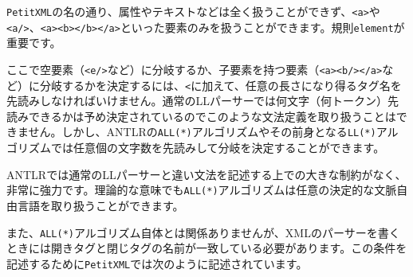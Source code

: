 \texttt{PetitXML}の名の通り、属性やテキストなどは全く扱うことができず、\texttt{\textless{}a\textgreater{}}や\texttt{\textless{}a/\textgreater{}}、\texttt{\textless{}a\textgreater{}\textless{}b\textgreater{}\textless{}/b\textgreater{}\textless{}/a\textgreater{}}といった要素のみを扱うことができます。規則\texttt{element}が重要です。

\begin{Shaded}
\begin{Highlighting}[]
\NormalTok{element returns [}\NormalTok{ e]}
\NormalTok{    : (}\CharTok{\textquotesingle{}\textless{}\textquotesingle{}}\CharTok{\textquotesingle{}\textgreater{}\textquotesingle{}}\CharTok{\textquotesingle{}\textgreater{}\textquotesingle{}}\NormalTok{ \{}
\NormalTok{)}
 \NormalTok{);\})}
\NormalTok{    | (}\CharTok{\textquotesingle{}\textless{}\textquotesingle{}} \NormalTok{);\})}
\NormalTok{    ;}
\end{Highlighting}
\end{Shaded}

ここで空要素（\texttt{\textless{}e/\textgreater{}}など）に分岐するか、子要素を持つ要素（\texttt{\textless{}a\textgreater{}\textless{}b/\textgreater{}\textless{}/a\textgreater{}}など）に分岐するかを決定するには、\texttt{\textless{}}に加えて、任意の長さになり得るタグ名を先読みしなければいけません。通常のLLパーサーでは何文字（何トークン）先読みできるかは予め決定されているのでこのような文法定義を取り扱うことはできません。しかし、ANTLRの\texttt{ALL(*)}アルゴリズムやその前身となる\texttt{LL(*)}アルゴリズムでは任意個の文字数を先読みして分岐を決定することができます。

ANTLRでは通常のLLパーサーと違い文法を記述する上での大きな制約がなく、非常に強力です。理論的な意味でも\texttt{ALL(*)}アルゴリズムは任意の決定的な文脈自由言語を取り扱うことができます。

また、\texttt{ALL(*)}アルゴリズム自体とは関係ありませんが、XMLのパーサーを書くときには開きタグと閉じタグの名前が一致している必要があります。この条件を記述するために\texttt{PetitXML}では次のように記述されています。


